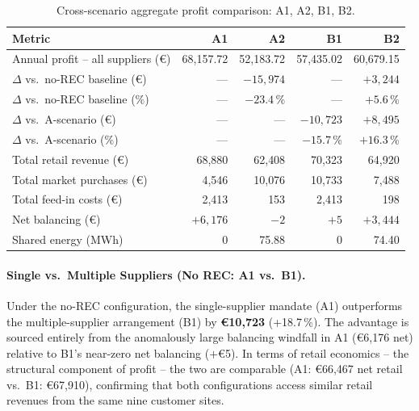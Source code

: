 \begin{table}[htbp]
\centering
\caption{Cross-scenario aggregate profit comparison: A1, A2, B1, B2.}
\label{tab:AB_crosscomparison}
\renewcommand{\arraystretch}{1.35}
\begin{tabular}{@{}lrrrr@{}}
\toprule
\textbf{Metric}                   & \textbf{A1}
                                  & \textbf{A2}
                                  & \textbf{B1}
                                  & \textbf{B2} \\
\midrule
Annual profit -- all suppliers (€)& 68{,}157.72  & 52{,}183.72  & 57{,}435.02  & 60{,}679.15 \\
$\Delta$ vs.\ no-REC baseline (€) & ---           & $-15{,}974$   & ---          & $+3{,}244$ \\
$\Delta$ vs.\ no-REC baseline (\%)& ---           & $-23.4$\,\%   & ---          & $+5.6$\,\% \\
$\Delta$ vs.\ A-scenario (€)      & ---           & ---           & $-10{,}723$  & $+8{,}495$ \\
$\Delta$ vs.\ A-scenario (\%)     & ---           & ---           & $-15.7$\,\%  & $+16.3$\,\% \\
\addlinespace
Total retail revenue (€)         & 68{,}880      & 62{,}408      & 70{,}323     & 64{,}920   \\
Total market purchases (€)       & 4{,}546       & 10{,}076      & 10{,}733     & 7{,}488    \\
Total feed-in costs (€)          & 2{,}413       & 153           & 2{,}413      & 198        \\
Net balancing (€)                & $+6{,}176$    & $-2$          & $+5$         & $+3{,}444$ \\
Shared energy (MWh)              & 0             & 75.88         & 0            & 74.40      \\
\bottomrule
\end{tabular}
\end{table}

\paragraph{Single vs.\ Multiple Suppliers (No REC: A1 vs.\ B1).}
Under the no-REC configuration, the single-supplier mandate (A1) outperforms the
multiple-supplier arrangement (B1) by \textbf{€10{,}723} (+18.7\,\%).  The
advantage is sourced entirely from the anomalously large balancing windfall in
A1 (€6{,}176 net) relative to B1's near-zero net balancing ($+$€5).  In terms
of retail economics -- the structural component of profit -- the two are
comparable (A1: €66{,}467 net retail vs.\ B1: €67{,}910), confirming that both
configurations access similar retail revenues from the same nine customer sites.

